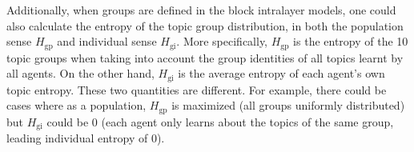 Additionally, when groups are defined in the block intralayer models, one could also calculate the entropy of the topic group distribution, in both the population sense $H_{\mathrm{gp}}$ and individual sense $H_{\mathrm{gi}}$. More specifically, $H_{\mathrm{gp}}$ is the entropy of the 10 topic groups when taking into account the group identities of all topics learnt by all agents. On the other hand, $H_{\mathrm{gi}}$ is the average entropy of each agent's own topic entropy. These two quantities are different. For example, there could be cases where as a population, $H_{\mathrm{gp}}$ is maximized (all groups uniformly distributed) but $H_{\mathrm{gi}}$ could be 0 (each agent only learns about the topics of the same group, leading individual entropy of 0).
